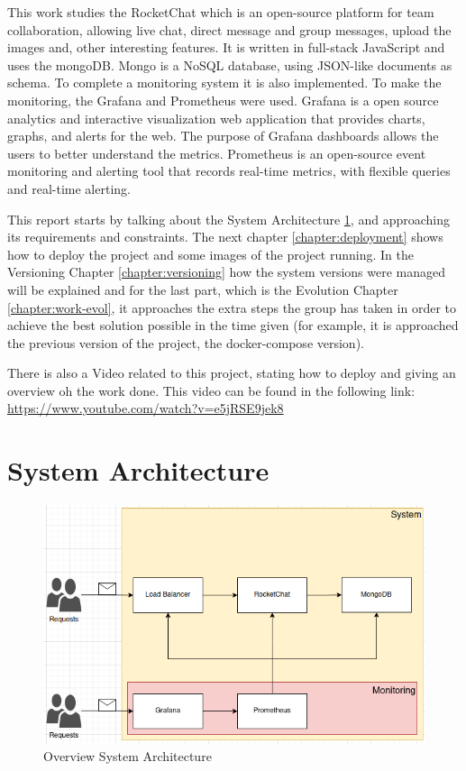 \documentclass[12pt,a4paper,oneside]{report}
\begin{document}
This work studies the RocketChat which is an open-source platform for team collaboration, allowing live chat, direct message and group messages, upload the images and, other interesting features. \cite{rocketchat} It is written in full-stack JavaScript and uses the \ac{mongoDB}. Mongo is a NoSQL database, using JSON-like documents as schema. \cite{mongodb} To complete a monitoring system it is also implemented. To make the monitoring, the Grafana and Prometheus were used. Grafana is a open source analytics and interactive visualization web application that provides charts, graphs, and alerts for the web. \cite{grafana} The purpose of Grafana dashboards allows the users to better understand the metrics. Prometheus is an open-source event monitoring and alerting tool that records real-time metrics, with flexible queries and real-time alerting. \cite{prometheus}

This report starts by talking about the System Architecture \ref{chapter:sys-architecture}, and approaching its requirements and constraints. The next chapter \ref{chapter:deployment} shows how to deploy the project and some images of the project running. In the Versioning Chapter \ref{chapter:versioning} how the system versions were managed will be explained and for the last part, which is the Evolution Chapter \ref{chapter:work-evol}, it approaches the extra steps the group has taken in order to achieve the best solution possible in the time given (for example, it is approached the previous version of the project, the docker-compose version).

There is also a Video related to this project, stating how to deploy and giving an overview oh the work done. This video can be found in the following link: \url{https://www.youtube.com/watch?v=e5jRSE9jek8}

\cleardoublepage
\chapter{System Architecture}
\label{chapter:sys-architecture}
\begin{figure}[h]
    \centering
    \includegraphics[width=1.0\textwidth]{./pictures/overview-system-architecture.png}
    \caption{Overview System Architecture}
    \label{fig:overview-sys-architecture}
\end{figure}
\end{document}
